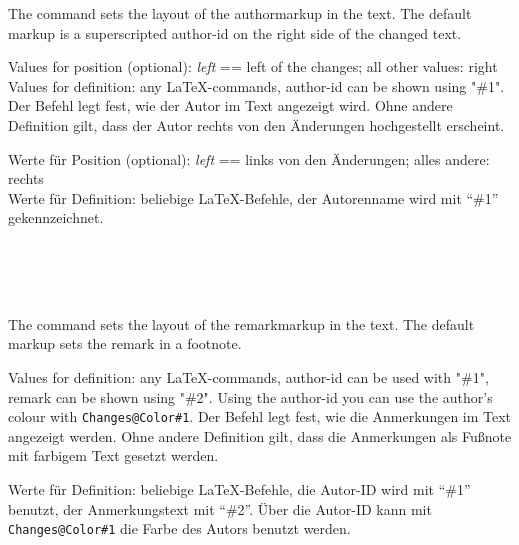 \DescribeMacro{\setauthormarkup}
\ifENGLISH
	The command  sets the layout of the authormarkup in the text.
	The default markup is a superscripted author-id on the right side of the changed text.

	Values for position (optional): \emph{left} == left of the changes; all other values: right\\
	Values for definition: any \LaTeX-commands, author-id can be shown using "\#1".
\fi
	\ifGERMAN
		Der Befehl  legt fest, wie der Autor im Text angezeigt wird.
		Ohne andere Definition gilt, dass der Autor rechts von den Änderungen hochgestellt erscheint.

		Werte für Position (optional): \emph{left} == links von den Änderungen; alles andere: rechts\\
		Werte für Definition: beliebige \LaTeX-Befehle, der Autorenname wird mit "`\#1"' gekennzeichnet.
	\fi
\begin{einspiel}
	\>
\end{einspiel}
\begin{einspiel}[true]
	\>\\
	\>\\
	\>\\
	\>
\end{einspiel}

\DescribeMacro{\setremarkmarkup}
\ifENGLISH
	The command  sets the layout of the remarkmarkup in the text.
	The default markup sets the remark in a footnote.

	Values for definition: any \LaTeX-commands, author-id can be used with "\#1", remark can be shown using "\#2".
	Using the author-id you can use the author's colour with \texttt{Changes@Color\#1}.
\fi
	\ifGERMAN
		Der Befehl  legt fest, wie die Anmerkungen im Text angezeigt werden.
		Ohne andere Definition gilt, dass die Anmerkungen als Fußnote mit farbigem Text gesetzt werden.

		Werte für Definition: beliebige \LaTeX-Befehle, die Autor-ID wird mit "`\#1"' benutzt, der Anmerkungstext mit "`\#2"'.
		Über die Autor-ID kann mit \texttt{Changes@Color\#1} die Farbe des Autors benutzt werden.
	\fi
\begin{einspiel}
	\>
\end{einspiel}
\begin{einspiel}[true]
	\>\\
	\>
\end{einspiel}

